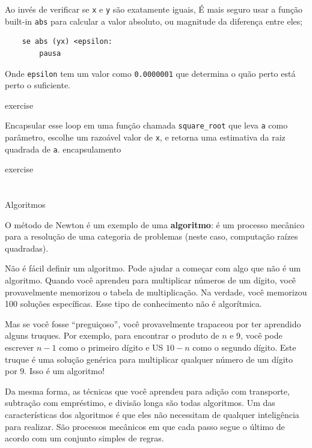 \documentclass[10pt]{book}
\begin{document}
\begin{exercise}
{Ao invés de verificar se {\tt x} e {\tt y} são exatamente iguais,
É mais seguro usar a função built-in {\tt abs} para calcular a
valor absoluto, ou magnitude da diferença entre eles;

\begin{verbatim}
    se abs (yx) <epsilon:
        pausa
\end{verbatim}
%
Onde \verb "epsilon" tem um valor como {\tt 0.0000001} que
determina o quão perto está perto o suficiente.

\begin{} exercise

Encapsular esse loop em uma função chamada \verb "square_root"
que leva {\tt a} como parâmetro, escolhe um razoável
valor de {\tt x}, e retorna uma estimativa da raiz quadrada
de {\tt a}.
\index{} encapsulamento

\end{} exercise


\section{} Algoritmos

O método de Newton é um exemplo de uma {\bf algoritmo}: é um
processo mecânico para a resolução de uma categoria de problemas (neste
caso, computação raízes quadradas).

Não é fácil definir um algoritmo. Pode ajudar a começar
com algo que não é um algoritmo. Quando você aprendeu
para multiplicar números de um dígito, você provavelmente memorizou o
tabela de multiplicação. Na verdade, você memorizou 100 soluções específicas.
Esse tipo de conhecimento não é algorítmica.

Mas se você fosse ``preguiçoso'', você provavelmente trapaceou por ter aprendido alguns
truques. Por exemplo, para encontrar o produto de $ n $ e 9, você pode
escrever $ n-1 $ como o primeiro dígito e US $ 10-n $ como o segundo
dígito. Este truque é uma solução genérica para multiplicar qualquer
número de um dígito por 9. Isso é um algoritmo!

Da mesma forma, as técnicas que você aprendeu para adição com transporte,
subtração com empréstimo, e divisão longa são todas algoritmos. Um
das características dos algoritmos é que eles não necessitam de qualquer
inteligência para realizar. São processos mecânicos em que
cada passo segue o último de acordo com um conjunto simples de regras.

}
\end{exercise}
\end{document}
